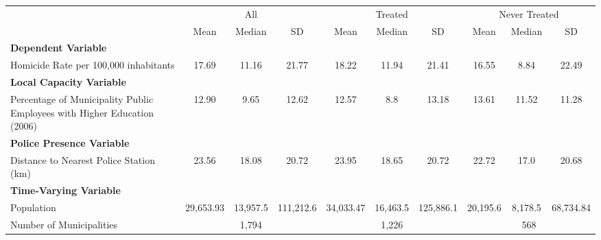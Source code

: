 \documentclass{article}
\begin{document}
\begin{table}[!htbp]
\centering
\begin{adjustbox}{max width=\textwidth}
\begin{tabular}{lccccccccc}
\toprule
& \multicolumn{3}{c}{All} & \multicolumn{3}{c}{Treated} & \multicolumn{3}{c}{Never Treated} \\
\cmidrule(lr){2-4} \cmidrule(lr){5-7} \cmidrule(lr){8-10}
& Mean & Median & SD & Mean & Median & SD & Mean & Median & SD \\
\midrule
\multicolumn{10}{l}{\textbf{Dependent Variable}} \\
Homicide Rate per 100,000 inhabitants & 17.69 & 11.16 & 21.77 & 18.22 & 11.94 & 21.41 & 16.55 & 8.84 & 22.49 \\[0.5em]
\midrule
\multicolumn{10}{l}{\textbf{Local Capacity Variable}} \\
Percentage of Municipality Public Employees with Higher Education (2006) & 12.90 & 9.65 & 12.62 & 12.57 & 8.8 & 13.18 & 13.61 & 11.52 & 11.28 \\[0.5em]
\midrule
\multicolumn{10}{l}{\textbf{Police Presence Variable}} \\
Distance to Nearest Police Station (km) & 23.56 & 18.08 & 20.72 & 23.95 & 18.65 & 20.72 & 22.72 & 17.0 & 20.68 \\[0.5em]
\midrule
\multicolumn{10}{l}{\textbf{Time-Varying Variable}} \\
Population & 29,653.93 & 13,957.5 & 111,212.6 & 34,033.47 & 16,463.5 & 125,886.1 & 20,195.6 & 8,178.5 & 68,734.84 \\
\midrule
Number of Municipalities & \multicolumn{3}{c}{1,794} & \multicolumn{3}{c}{1,226} & \multicolumn{3}{c}{568} \\
\bottomrule
\end{tabular}
\end{adjustbox}
\end{table}
\end{document}
